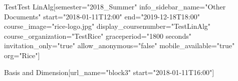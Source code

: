 \documentclass[12pt]{article}
\begin{document}


\def\defaultproblemattributes{attempts="1" showanswer="attempted" rerandomize="per_student"}

\begin{edXcourse}{Test}{Test LinAlg}[semester="2018_Summer" info_sidebar_name="Other Documents" start="2018-01-11T12:00" end="2019-12-18T18:00" course_image="rice-logo.jpg" display_coursenumber="TestLinAlg" course_organization="TestRice" graceperiod="1800 seconds" invitation_only="true" allow_anonymous="false" mobile_available="true"  org="Rice"]
 
%  


% 
 

 






\begin{edXchapter}{Basis and Dimension}[url_name="block3" start="2018-01-11T16:00"]




\def\edxbaseoutputname{b3basis}







% 




\endedxsequential


\def\edxbaseoutputname{b3ranknullity}







% 




\endedxsequential




\end{edXchapter}

\end{edXcourse}
\end{document}
